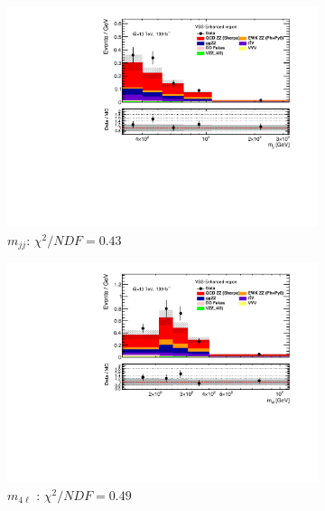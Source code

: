 \begin{figure}[!htbp]
    \centering
    \begin{subfigure}{.49\textwidth}
        \centering
        \includegraphics[width=.98\linewidth]{figures/Results/RecoDist_VBSEnhanced/reco_mjj_SR.pdf}
        \caption{ \footnotesize{$m_{jj}$}: $\chi^2/NDF = 0.43$ }
    \end{subfigure}
    \begin{subfigure}{.49\textwidth}
        \centering
        \includegraphics[width=.98\linewidth]{figures/Results/RecoDist_VBSEnhanced/reco_m4l_SR.pdf}
        \caption{ \footnotesize{$m_{4\ell}$ }: $\chi^2/NDF = 0.49$ }
    \end{subfigure}\\
    \begin{subfigure}{.49\textwidth}
        \centering

\end{subfigure}
\end{figure}
